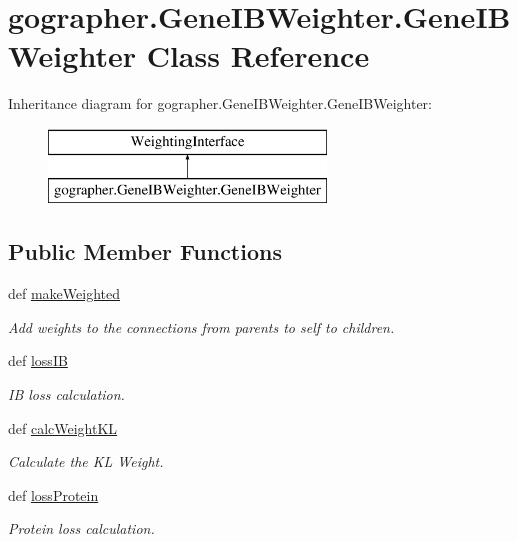 \hypertarget{classgographer_1_1_gene_i_b_weighter_1_1_gene_i_b_weighter}{\section{gographer.\-Gene\-I\-B\-Weighter.\-Gene\-I\-B\-Weighter Class Reference}
\label{classgographer_1_1_gene_i_b_weighter_1_1_gene_i_b_weighter}
}
Inheritance diagram for gographer.\-Gene\-I\-B\-Weighter.\-Gene\-I\-B\-Weighter\-:\begin{figure}[H]
\begin{center}
\leavevmode
\includegraphics[height=2.000000cm]{classgographer_1_1_gene_i_b_weighter_1_1_gene_i_b_weighter}
\end{center}
\end{figure}
\subsection*{Public Member Functions}
\begin{DoxyCompactItemize}
\item 
def \hyperlink{classgographer_1_1_gene_i_b_weighter_1_1_gene_i_b_weighter_a5a626b7ef6de417a4f96ceef062ba361}{make\-Weighted}
\begin{DoxyCompactList}\small\item\em Add weights to the connections from parents to self to children. \end{DoxyCompactList}\item 
def \hyperlink{classgographer_1_1_gene_i_b_weighter_1_1_gene_i_b_weighter_a26f9742bc8912785ad39d6dec08a3136}{loss\-I\-B}
\begin{DoxyCompactList}\small\item\em I\-B loss calculation. \end{DoxyCompactList}\item 
def \hyperlink{classgographer_1_1_gene_i_b_weighter_1_1_gene_i_b_weighter_a2e245fc6a4d88fb42c6e0259e574fa18}{calc\-Weight\-K\-L}
\begin{DoxyCompactList}\small\item\em Calculate the K\-L Weight. \end{DoxyCompactList}\item 
def \hyperlink{classgographer_1_1_gene_i_b_weighter_1_1_gene_i_b_weighter_a3c760ca6d2d8a2e30e04fa9ae3ea8ca0}{loss\-Protein}
\begin{DoxyCompactList}\small\item\em Protein loss calculation. \end{DoxyCompactList}\end{DoxyCompactItemize}


